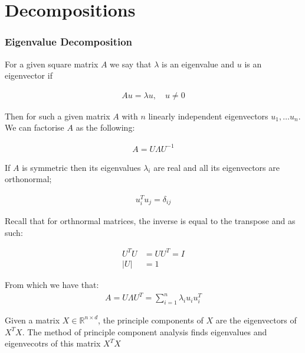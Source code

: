 \section{Decompositions}
\subsubsection{Eigenvalue Decomposition} 
For a given square matrix $A$ we say that $\lambda$ is an eigenvalue and $u$ is an eigenvector if 

\begin{align*}
	Au = \lambda u, \quad u \neq 0
\end{align*}

Then for such a given matrix $A$ with $n$ linearly independent eigenvectors $u_1, \dots u_n$. We can factorise $A$ as the following:

\begin{align*}
	A = U\Lambda U^{-1}
\end{align*}

If $A$ is symmetric then its eigenvalues $\lambda_i$ are real and all its eigenvectors are orthonormal;

\begin{align*}
	u_i^Tu_j = \delta_{ij}
\end{align*}

Recall that for orthnormal matrices, the inverse is equal to the transpose and as such:

\begin{align*}
	U^TU & = UU^T  = I\\
	|U| & = 1
\end{align*}

From which we have that:
\begin{align*}
	A = U \Lambda U^T = \sum^n_{i=1} \lambda_i u_i u_i^T
\end{align*}

Given a matrix $X \in \mathbb{R}^{n \times d}$, the principle components of $X$ are the eigenvectors of $X^TX$. The method of principle component analysis finds eigenvalues and eigenvecotrs of this matrix $X^TX$

